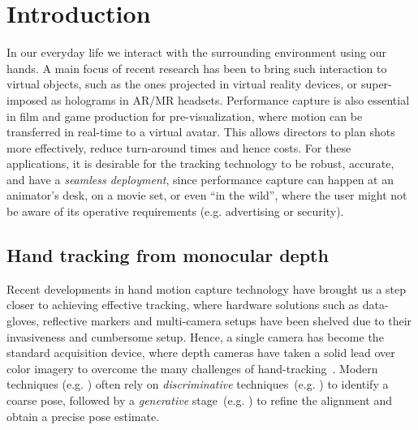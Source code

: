 \section{Introduction} \label{sec:honline-intro}
In our everyday life we interact with the surrounding environment using our hands. A main focus of recent research has been to bring such interaction to virtual objects, such as the ones projected in virtual reality devices, %
or super-imposed as holograms in AR/MR headsets. 
Performance capture is also essential in film and game production for pre-visualization, where motion can be transferred in real-time to a virtual avatar. This allows directors to plan shots more effectively, reduce turn-around times and hence costs.
For these applications, it is desirable for the tracking technology to be robust, accurate, and have a \emph{seamless deployment}, since performance capture can happen at an animator's desk, on a movie set, or even ``in the wild'',  where the user might not be aware of its operative requirements (e.g. advertising or security).

\subsection*{Hand tracking from monocular depth}
Recent developments in hand motion capture technology have brought us a step closer to achieving effective tracking, where hardware solutions such as data-gloves, reflective markers and multi-camera setups have been shelved due to their invasiveness and cumbersome setup.
Hence, a single camera has become the standard acquisition device, where depth cameras  have taken a solid lead over color imagery to overcome the many challenges of hand-tracking~\cite{supancic2015depth}. 
Modern techniques (e.g. \cite{taylor2016joint}) often rely on \emph{discriminative} techniques~(e.g. \cite{valentin2016learning}) to identify a coarse pose, followed by a \emph{generative} stage~(e.g. \cite{tkach2016sphere}) to refine the alignment and obtain a precise pose estimate.



